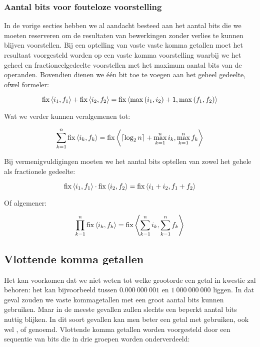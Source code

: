 \subsubsection{Aantal bits voor fouteloze voorstelling}
In de vorige secties hebben we al aandacht besteed aan het aantal bits die we moeten reserveren om de resultaten van bewerkingen zonder verlies te kunnen blijven voorstellen. Bij een optelling van vaste vaste komma getallen moet het resultaat voorgesteld worden op een vaste komma voorstelling waarbij we het geheel en fractioneelgedeelte voorstellen met het maximum aantal bits van de operanden. Bovendien dienen we \'e\'en bit toe te voegen aan het geheel gedeelte, ofwel formeler:

\begin{equation}
\operatorname{fix}\left\langle i_1,f_1 \right\rangle+\operatorname{fix}\left\langle i_2,f_2 \right\rangle=\operatorname{fix}\left\langle \max\left( i_1,i_2 \right)+1,\max\left( f_1,f_2 \right) \right\rangle
\end{equation}

Wat we verder kunnen veralgemenen tot:

\begin{equation}
\displaystyle\sum_{k=1}^{n}{\operatorname{fix}\left\langle i_k,f_k \right\rangle}=\operatorname{fix}\left\langle \left\lceil \log_2n \right\rceil+\max_{k=1}^{n}{i_k},\max_{k=1}^{n}{f_k} \right\rangle
\end{equation}

Bij vermenigvuldigingen moeten we het aantal bits optellen van zowel het gehele als fractionele gedeelte:

\begin{equation}
\operatorname{fix}\left\langle i_1,f_1 \right\rangle\cdot\operatorname{fix}\left\langle i_2,f_2 \right\rangle=\operatorname{fix}\left\langle i_1+i_2,f_1+f_2 \right\rangle
\end{equation}

Of algemener:

\begin{equation}
\displaystyle\prod_{k=1}^{n}{\operatorname{fix}\left\langle i_k,f_k \right\rangle}=\operatorname{fix}\left\langle \displaystyle\sum_{k=1}^{n}{i_k},\displaystyle\sum_{k=1}^{n}{f_k} \right\rangle
\end{equation}

\subsection{Vlottende komma getallen}
Het kan voorkomen dat we niet weten tot welke grootorde een getal in kwestie zal behoren: het kan bijvoorbeeld tussen $0.000\ 000\ 001$ en $1\ 000\ 000\ 000$ liggen. In dat geval zouden we vaste kommagetallen met een groot aantal bits kunnen gebruiken. Maar in de meeste gevallen zullen slechts een beperkt aantal bits nuttig blijken. In dit soort gevallen kan men beter een getal met  gebruiken, ook wel ,  of  genoemd. Vlottende komma getallen worden voorgesteld door een sequentie van bits die in drie groepen worden onderverdeeld:

